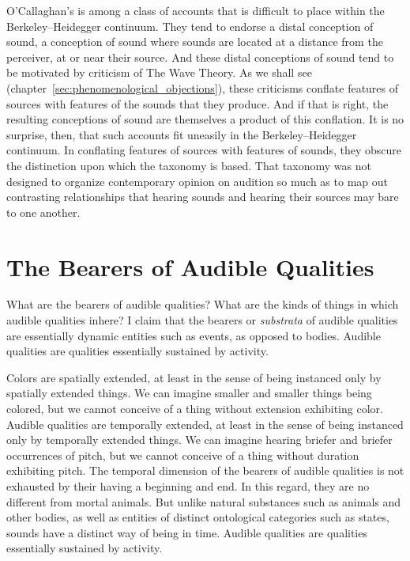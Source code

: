 O'Callaghan's is among a class of accounts that is difficult to place within the Berkeley--Heidegger continuum. They tend to endorse a distal conception of sound, a conception of sound where sounds are located at a distance from the perceiver, at or near their source. And these distal conceptions of sound tend to be motivated by criticism of The Wave Theory. As we shall see (chapter~\ref{sec:phenomenological_objections}), these criticisms conflate features of sources with features of the sounds that they produce. And if that is right, the resulting conceptions of sound are themselves a product of this conflation. It is no surprise, then, that such accounts fit uneasily in the Berkeley--Heidegger continuum. In conflating features of sources with features of sounds, they obscure the distinction upon which the taxonomy is based. That taxonomy was not designed to organize contemporary opinion on audition so much as to map out contrasting relationships that hearing sounds and hearing their sources may bare to one another.


\section{The Bearers of Audible Qualities} %
\label{sec:the_emph_substrata}

What are the bearers of audible qualities? What are the kinds of things in which audible qualities inhere? I claim that the bearers or \emph{substrata} of audible qualities are essentially dynamic entities such as events, as opposed to bodies. Audible qualities are qualities essentially sustained by activity.


Colors are spatially extended, at least in the sense of being instanced only by spatially extended things. We can imagine smaller and smaller things being colored, but we cannot conceive of a thing without extension exhibiting color. Audible qualities are temporally extended, at least in the sense of being instanced only by temporally extended things. We can imagine hearing briefer and briefer occurrences of pitch, but we cannot conceive of a thing without duration exhibiting pitch. The temporal dimension of the bearers of audible qualities is not exhausted by their having a beginning and end. In this regard, they are no different from mortal animals. But unlike natural substances such as animals and other bodies, as well as entities of distinct ontological categories such as states, sounds have a distinct way of being in time. Audible qualities are qualities essentially sustained by activity.

